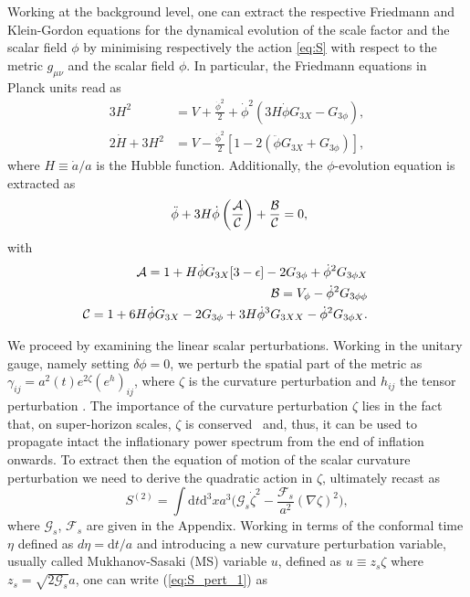 \documentclass[nofootinbib,aps,a4paper,letterpaper,superscriptaddress,
twocolumn,times]{revtex4}
\renewcommand{\(}{\left(}
\renewcommand{\)}{\right)}
\renewcommand{\(}{\left(}
\renewcommand{\)}{\right)}
\renewcommand{\[}{\left[}
\renewcommand{\]}{\right]}
\begin{document}
Working at the background level, one can extract the respective Friedmann and 
Klein-Gordon equations for the dynamical evolution of the scale factor and the 
scalar field $\phi$ by minimising respectively the action \eqref{eq:S} with 
respect to the metric $g_{\mu\nu}$ and the scalar field $\phi$. 
In particular, the  Friedmann equations in Planck units read as
\cite{Horndeski:1974wa, 
Deffayet:2011gz, Kobayashi:2011nu} 
\begin{align}\label{eq:Friedmann}
     3H^2 &=V+ \frac{\dot{\phi}^2}{2}+\dot{\phi}^2 (3H\dot{\phi}G_{3X} 
-G_{3\phi}), \\ \label{eq:Friedmann2}
     2\dot{H}+3H^2 &= V-\frac{\dot{\phi}^2}{2}\left[1 -2(\ddot{\phi}G_{3X} 
+G_{3\phi})\right],
\end{align}
where  $H\equiv 
\dot{a}/a$ is the   Hubble function.
Additionally,  the
$\phi$-evolution equation is extracted as
\begin{eqnarray}\label{eq:KG_phi}
    \ \ddot{\phi}+  3H\dot{\phi} \left(\frac{{\cal{A}}}{{\cal{C}}}\right) 
+\frac{{\cal{B}}}{{\cal{C}}}         =0 ,
\end{eqnarray}
with 
\begin{eqnarray}
&&
\!\!\!\!\!\!\!\!\!\!\!\!\!\!\!\!\! 
{\cal{A}}=1+ H\dot{\phi}G_{3X}[3-\epsilon] 
-2G_{3\phi}+\dot{\phi}^2G_{3\phi 
X} \nonumber\\
&&\!\!\!\!\!\!\!\!\!\!\!\!\!\!\!\!\!\! 
{\cal{B}}= V_{\phi}-\dot{\phi}^2G_{3\phi\phi}
\nonumber\\
&&\!\!\!\!\!\!\!\!\!\!\! \!\!\!\!\!\!  {\cal{C}}=1+6H\dot{\phi}G_{3X} 
-2G_{3\phi}+3H\dot{\phi}^3G_{3XX}-\dot{\phi}^2G_{3\phi X}.
\end{eqnarray} 

 
 
We proceed by examining the linear scalar perturbations. Working in the unitary 
gauge, namely setting  
$\delta\phi=0$,   we perturb the spatial part of the metric as 
$\gamma_{ij}=a^2(t)  e^{2\zeta} (e^{h})_{ij}$, where $\zeta$ is the curvature 
perturbation and $h_{ij}$  the tensor 
perturbation 
\cite{DeFelice:2011bh,Kobayashi:2011nu,Akama:2018cqv}. The importance of the curvature perturbation $\zeta$ lies
in the fact that, on super-horizon scales, $\zeta$ is conserved~\cite{Wands:2000dp} and, thus, it can be used to propagate intact the inflationary power spectrum from the end of inflation onwards. To extract then the equation of motion of the scalar curvature perturbation we need to derive the quadratic action 
in $\zeta$, ultimately recast as \cite{Kobayashi:2011nu}
\begin{equation}\label{eq:S_pert_1}
    S^{(2)}=\int \mathrm{d}t \mathrm{d}^3x a^3 \bigg(\mathcal{G}_s 
\dot{\zeta}^2  -\frac{\mathcal{F}_s}{a^2} (\nabla \zeta)^2 \bigg),
\end{equation}
where  $\mathcal{G}_s$, $\mathcal{F}_s$ are   given in the Appendix.  
 Working in terms of the conformal time $\eta$ defined as $d\eta=\mathrm{d}t/a$ 
and introducing a new curvature perturbation variable, usually called 
Mukhanov-Sasaki (MS) variable $u$, defined as $u\equiv z_s \zeta$ where 
$z_s=\sqrt{2\mathcal{G}_s}a$, one can write  (\ref{eq:S_pert_1}) as
\end{document}

